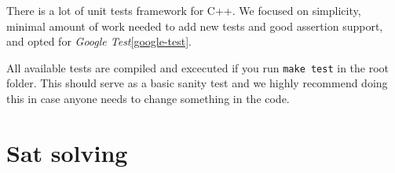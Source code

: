 There is a lot of unit tests framework for C++.
We focused on simplicity, minimal amount of work needed to add new tests
  and good assertion support, and opted for
  \emph{Google Test}\ref{google-test}.

All available tests are compiled and excecuted if you run \texttt{make test}
  in the root folder.
This should serve as a basic sanity test and we highly recommend
  doing this in case anyone needs to change something in the code.

\section{Sat solving}

